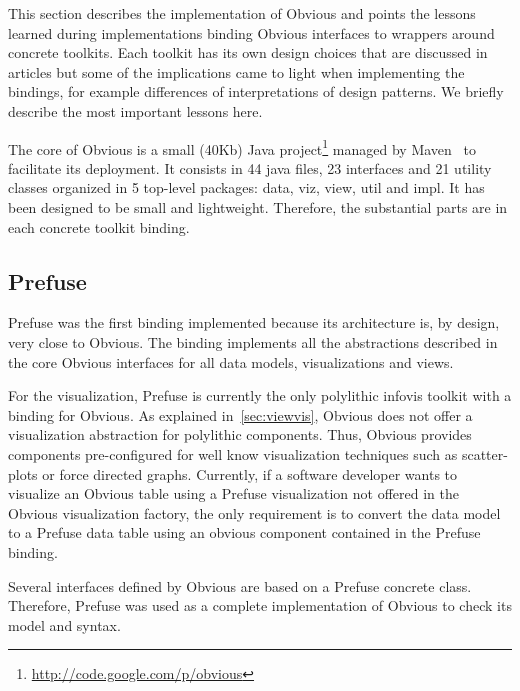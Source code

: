 
This section describes the implementation of Obvious and points the
lessons learned during implementations binding Obvious interfaces to
wrappers around concrete toolkits.  Each toolkit has its own design
choices that are discussed in articles but some of the implications
came to light when implementing the bindings, for example differences
of interpretations of design patterns.  We briefly describe the most
important lessons here.

The core of Obvious is a small (40Kb) Java
project\footnote{\url{http://code.google.com/p/obvious}} managed by
Maven~\cite{Maven} to facilitate its deployment.  It consists in 44
java files, 23 interfaces and 21 utility classes organized in 5
top-level packages: data, viz, view, util and impl.  It has been
designed to be small and lightweight.  Therefore, the substantial
parts are in each concrete toolkit binding.

\subsection{Prefuse}

Prefuse was the first binding implemented because its architecture is,
by design, very close to Obvious.  The binding implements all the
abstractions described in the core Obvious interfaces for all data
models, visualizations and views.

For the visualization, Prefuse is currently the only polylithic
infovis toolkit with a binding for Obvious.  As
explained in~\ref{sec:viewvis}, Obvious does not offer a visualization
abstraction for polylithic components.  Thus, Obvious provides
components pre-configured for well know visualization techniques such
as scatter-plots or force directed graphs.  Currently, if a software
developer wants to visualize an Obvious table using a Prefuse
visualization not offered in the Obvious visualization factory, the
only requirement is to convert the data model to a Prefuse data table
using an obvious component contained in the Prefuse binding.  


Several interfaces defined by Obvious are based on a Prefuse concrete
class.  Therefore, Prefuse was used as a complete implementation of
Obvious to check its model and syntax.

